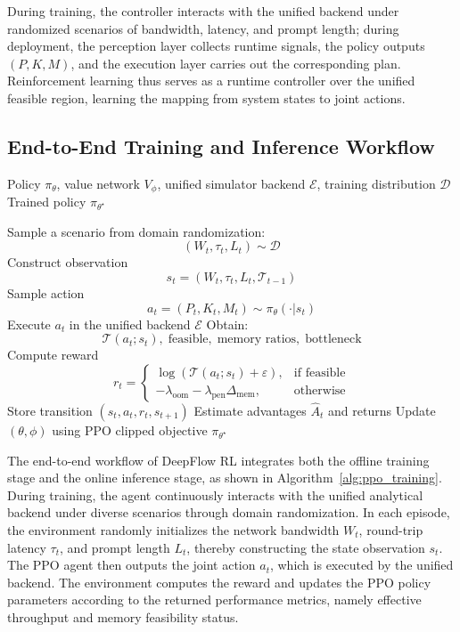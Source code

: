\documentclass[a4paper,fleqn]{cas-dc}
\begin{document}
During training, the controller interacts with the unified backend under randomized scenarios of bandwidth, latency, and prompt length; during deployment, the perception layer collects runtime signals, the policy outputs $(P,K,M)$, and the execution layer carries out the corresponding plan. Reinforcement learning thus serves as a runtime controller over the unified feasible region, learning the mapping from system states to joint actions.

\subsection{End-to-End Training and Inference Workflow}

\begin{algorithm}[t]
\caption{PPO-Based Adaptive Scheduling in DeepFlow RL}
\label{alg:ppo_training}
\begin{algorithmic}[1]
\Require Policy $\pi_\theta$, value network $V_\phi$, unified simulator backend $\mathcal{E}$, training distribution $\mathcal{D}$
\Ensure Trained policy $\pi_{\theta^\star}$

    \State Sample a scenario from domain randomization:
    \[
    (W_t,\tau_t,L_t)\sim \mathcal{D}
    \]
    \State Construct observation
    \[
    s_t=(W_t,\tau_t,L_t,\mathcal{T}_{t-1})
    \]
    \State Sample action
    \[
    a_t=(P_t,K_t,M_t)\sim \pi_\theta(\cdot|s_t)
    \]
    \State Execute $a_t$ in the unified backend $\mathcal{E}$
    \State Obtain:
    \[
    \mathcal{T}(a_t;s_t),\; \text{feasible},\; \text{memory ratios},\; \text{bottleneck}
    \]
    \State Compute reward
    \[
    r_t=
    \begin{cases}
    \log(\mathcal{T}(a_t;s_t)+\varepsilon), & \text{if feasible}\\
    -\lambda_{\mathrm{oom}}-\lambda_{\mathrm{pen}}\Delta_{\mathrm{mem}}, & \text{otherwise}
    \end{cases}
    \]
    \State Store transition $(s_t,a_t,r_t,s_{t+1})$
    \State Estimate advantages $\hat{A}_t$ and returns
    \State Update $(\theta,\phi)$ using PPO clipped objective
\EndFor
\State \Return $\pi_{\theta^\star}$
\end{algorithmic}
\end{algorithm}

The end-to-end workflow of DeepFlow RL integrates both the offline training stage and the online inference stage, as shown in Algorithm~\ref{alg:ppo_training}. During training, the agent continuously interacts with the unified analytical backend under diverse scenarios through domain randomization. In each episode, the environment randomly initializes the network bandwidth $W_t$, round-trip latency $\tau_t$, and prompt length $L_t$, thereby constructing the state observation $s_t$. The PPO agent then outputs the joint action $a_t$, which is executed by the unified backend. The environment computes the reward and updates the PPO policy parameters according to the returned performance metrics, namely effective throughput and memory feasibility status.
\end{document}
